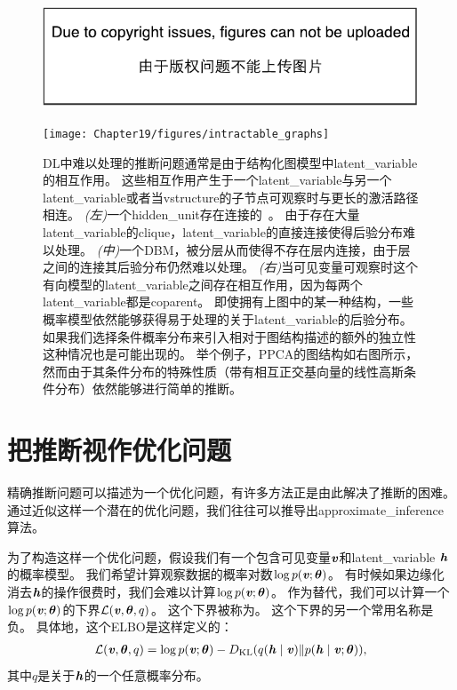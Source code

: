 \begin{figure}[!htb]
\ifOpenSource
\centerline{\includegraphics{figure.pdf}}
\else
	\centerline{\texttt{[image: Chapter19/figures/intractable\_graphs]}}
\fi
\caption{\gls{DL}中难以处理的推断问题通常是由于结构化图模型中\gls{latent_variable}的相互作用。
这些相互作用产生于一个\gls{latent_variable}与另一个\gls{latent_variable}或者当\gls{vstructure}的子节点可观察时与更长的激活路径相连。
\emph{(左)}一个\gls{hidden_unit}存在连接的~\citep{Osindero+Hinton-2008}。
由于存在大量\gls{latent_variable}的\gls{clique}，\gls{latent_variable}的直接连接使得后验分布难以处理。
\emph{(中)}一个\gls{DBM}，被分层从而使得不存在层内连接，由于层之间的连接其后验分布仍然难以处理。
\emph{(右)}当可见变量可观察时这个有向模型的\gls{latent_variable}之间存在相互作用，因为每两个\gls{latent_variable}都是\gls{coparent}。
即使拥有上图中的某一种结构，一些概率模型依然能够获得易于处理的关于\gls{latent_variable}的后验分布。
如果我们选择条件概率分布来引入相对于图结构描述的额外的独立性这种情况也是可能出现的。
举个例子，\gls{PPCA}的图结构如右图所示，然而由于其条件分布的特殊性质（带有相互正交基向量的线性高斯条件分布）依然能够进行简单的推断。}
\label{fig:intractable_graphs}
\end{figure}



\section{把推断视作优化问题}
\label{sec:inference_as_optimization}

精确推断问题可以描述为一个优化问题，有许多方法正是由此解决了推断的困难。
通过近似这样一个潜在的优化问题，我们往往可以推导出\gls{approximate_inference}算法。


为了构造这样一个优化问题，假设我们有一个包含可见变量$\boldsymbol{\mathit{v}}$和\gls{latent_variable} $\boldsymbol{\mathit{h}}$的概率模型。
我们希望计算观察数据的概率对数$\log p(\boldsymbol{\mathit{v}};\boldsymbol{\theta})$。
有时候如果边缘化消去$\boldsymbol{\mathit{h}}$的操作很费时，我们会难以计算$\log p(\boldsymbol{\mathit{v}};\boldsymbol{\theta})$。
作为替代，我们可以计算一个$\log p(\boldsymbol{\mathit{v}};\boldsymbol{\theta})$的下界$\mathcal{L}(\boldsymbol{\mathit{v}},{\boldsymbol{\theta}},q)$。
这个下界被称为。
这个下界的另一个常用名称是负。
具体地，这个\gls{ELBO}是这样定义的：
\begin{align}
\mathcal{L}(\boldsymbol{\mathit{v}},{\boldsymbol{\theta}},q) = \log p(\boldsymbol{\mathit{v}};{\boldsymbol{\theta}}) - D_{\text{KL}}(q(\boldsymbol{\mathit{h}}\mid\boldsymbol{\mathit{v}}) \Vert p(\boldsymbol{\mathit{h}}\mid\boldsymbol{\mathit{v}};{\boldsymbol{\theta}})),
\end{align}
其中$q$是关于$\boldsymbol{\mathit{h}}$的一个任意概率分布。


